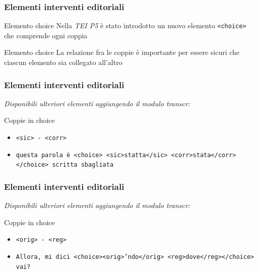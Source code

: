 \begin{frame}
    \frametitle{Elementi interventi editoriali}
    \addtocounter{nframe}{1}
    

    \begin{block}{Elemento choice}
        Nella \textit{TEI P5} è stato introdotto un nuovo elemento \texttt{<choice>} che comprende ogni coppia
    \end{block}
    \begin{block}{Elemento choice}
        La relazione fra le coppie è importante per essere sicuri che ciascun elemento sia collegato all’altro
    \end{block}
\end{frame}

\begin{frame}
    \frametitle{Elementi interventi editoriali}
    \addtocounter{nframe}{1}
    
    \textit{Disponibili ulteriori elementi aggiungendo il modulo transcr:}
    \begin{block}{Coppie in choice}
        \begin{itemize}
            \item \texttt{<sic> - <corr>} 
            \item[] \texttt{questa parola è <choice> <sic>statta</sic> <corr>stata</corr> </choice> scritta sbagliata}
        \end{itemize}
        
    \end{block}
    
\end{frame}

\begin{frame}
    \frametitle{Elementi interventi editoriali}
    \addtocounter{nframe}{1}
    
    \textit{Disponibili ulteriori elementi aggiungendo il modulo transcr:}
    \begin{block}{Coppie in choice}
        \begin{itemize}
            \item \texttt{<orig> - <reg>} 
            \item[] \texttt{Allora, mi dici <choice><orig>’ndo</orig> <reg>dove</reg></choice> vai?}
        \end{itemize}
        
    \end{block}
    
\end{frame}


